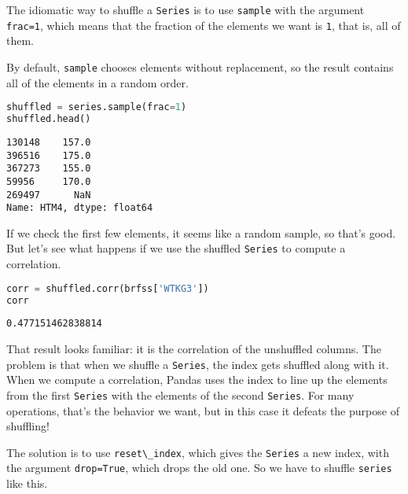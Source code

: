 The idiomatic way to shuffle a \passthrough{\lstinline!Series!} is to
use \passthrough{\lstinline!sample!} with the argument
\passthrough{\lstinline!frac=1!}, which means that the fraction of the
elements we want is \passthrough{\lstinline!1!}, that is, all of them.

\pagebreak

By default, \passthrough{\lstinline!sample!} chooses elements without
replacement, so the result contains all of the elements in a random
order.

\begin{lstlisting}[language=Python,style=source]
shuffled = series.sample(frac=1)
shuffled.head()
\end{lstlisting}

\begin{lstlisting}[style=output]
130148    157.0
396516    175.0
367273    155.0
59956     170.0
269497      NaN
Name: HTM4, dtype: float64
\end{lstlisting}

If we check the first few elements, it seems like a random sample, so
that's good. But let's see what happens if we use the shuffled
\passthrough{\lstinline!Series!} to compute a correlation.

\begin{lstlisting}[language=Python,style=source]
corr = shuffled.corr(brfss['WTKG3'])
corr
\end{lstlisting}

\begin{lstlisting}[style=output]
0.477151462838814
\end{lstlisting}

That result looks familiar: it is the correlation of the unshuffled
columns. The problem is that when we shuffle a
\passthrough{\lstinline!Series!}, the index gets shuffled along with it.
When we compute a correlation, Pandas uses the index to line up the
elements from the first \passthrough{\lstinline!Series!} with the
elements of the second \passthrough{\lstinline!Series!}. For many
operations, that's the behavior we want, but in this case it defeats the
purpose of shuffling!

The solution is to use \passthrough{\lstinline!reset\_index!}, which
gives the \passthrough{\lstinline!Series!} a new index, with the
argument \passthrough{\lstinline!drop=True!}, which drops the old one.
So we have to shuffle \passthrough{\lstinline!series!} like this.


